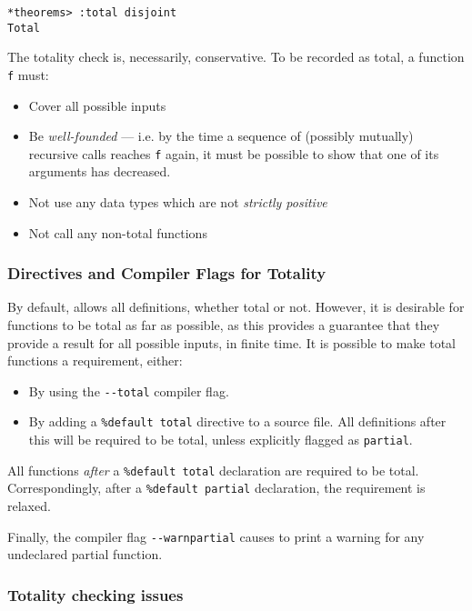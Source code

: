\begin{lstlisting}[style=stdout]
*theorems> :total disjoint
Total
\end{lstlisting}

\noindent
The totality check is, necessarily, conservative.
To be recorded as total, a function \texttt{f} must:

\begin{itemize}
\item Cover all possible inputs
\item Be \emph{well-founded} --- i.e. by the time a sequence of  (possibly mutually) recursive calls reaches \texttt{f} again, it must be possible to show that one of its arguments has decreased.
\item Not use any data types which are not \emph{strictly positive}
\item Not call any non-total functions
\end{itemize}

\subsubsection{Directives and Compiler Flags for Totality}

By default, \Idris{} allows all definitions, whether total or not.
However, it is desirable for functions to be total as far as possible, as this provides a guarantee that they provide a result for all possible inputs, in finite time. It is possible to make total functions a requirement, either:

\begin{itemize}
\item By using the \verb!--total! compiler flag.
\item By adding a \texttt{\%default total} directive to a source file.
All definitions after this will be required to be total, unless explicitly flagged as \texttt{partial}.
\end{itemize}

\noindent
All functions \emph{after} a \texttt{\%default total} declaration are required to be total.
Correspondingly, after a \texttt{\%default partial} declaration, the requirement is relaxed.

Finally, the compiler flag \verb!--warnpartial! causes \Idris{} to print a warning for any undeclared partial function.

\subsubsection{Totality checking issues}

